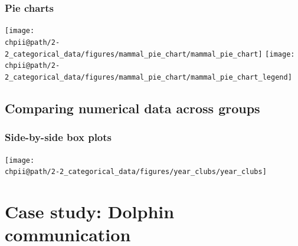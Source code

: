 \documentclass[slidestop,compress,mathserif]{beamer}
\makeatletter
\def\chpii@path{../../Chp 2}
\makeatother
\begin{document}
\begin{frame}
\frametitle{Pie charts}


\vspace{-0.5cm}

\begin{center}
\texttt{[image: \\chpii@path/2-2\_categorical\_data/figures/mammal\_pie\_chart/mammal\_pie\_chart]}
\texttt{[image: \\chpii@path/2-2\_categorical\_data/figures/mammal\_pie\_chart/mammal\_pie\_chart\_legend]}
\end{center}


\end{frame}



\subsection{Comparing numerical data across groups}


\begin{frame}
\frametitle{Side-by-side box plots}


\begin{center}
\texttt{[image: \\chpii@path/2-2\_categorical\_data/figures/year\_clubs/year\_clubs]}
\end{center}

\end{frame}


\section{Case study: Dolphin communication}

\end{document}
